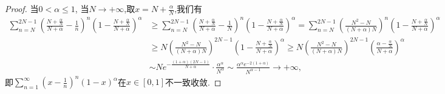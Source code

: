 \documentclass[../../main.tex]{subfiles}%
\begin{document}
\begin{proof}
当$0<\alpha\leqslant1$, 当$N\to+\infty$,取$x=N+\frac{\alpha}{N}$,我们有
$$
\begin{aligned}
\sum_{n=N}^{2N-1}{\left( \frac{N+\frac{\alpha}{N}}{N+\alpha}-\frac{1}{n} \right) ^n\left( 1-\frac{N+\frac{\alpha}{N}}{N+\alpha} \right) ^{\alpha}}&\geqslant \sum_{n=N}^{2N-1}{\left( \frac{N+\frac{\alpha}{N}}{N+\alpha}-\frac{1}{N} \right) ^n\left( 1-\frac{N+\frac{\alpha}{N}}{N+\alpha} \right) ^{\alpha}}
=\sum_{n=N}^{2N-1}{\left( \frac{N^2-N}{(N+\alpha )N} \right) ^n\left( 1-\frac{N+\frac{\alpha}{N}}{N+\alpha} \right) ^{\alpha}}
\\
&\geqslant N\left( \frac{N^2-N}{(N+\alpha )N} \right) ^{2N-1}\left( 1-\frac{N+\frac{\alpha}{N}}{N+\alpha} \right) ^{\alpha}
\geqslant N\left( \frac{N^2-N}{(N+\alpha )N} \right) ^{2N-1}\left( \frac{\alpha -\frac{\alpha}{N}}{N+\alpha} \right) ^{\alpha}
\\
&\sim Ne^{-\frac{\left( 1+\alpha \right) \left( 2N-1 \right)}{N+\alpha}}\cdot \frac{\alpha ^{\alpha}}{N^{\alpha}}\sim \frac{\alpha ^{\alpha}e^{-2\left( 1+\alpha \right)}}{N^{\alpha -1}}\rightarrow +\infty ,
\end{aligned}
$$
即$\sum\limits_{n=1}^{\infty}\left(x-\frac{1}{n}\right)^n(1-x)^\alpha$在$x\in[0,1]$不一致收敛.

\end{proof}
\end{document}
